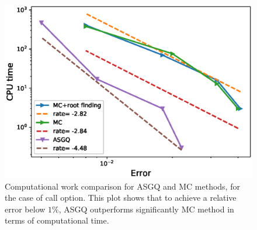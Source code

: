 \FloatBarrier
	\begin{figure}[h!]
\centering
\includegraphics[width=0.4\linewidth]{./figures/Call_Complexity_rates/error_vs_time}

\caption{Computational work comparison for ASGQ and MC methods, for the case of  call option. This plot shows that to achieve a relative error below $1\%$, ASGQ outperforms significantly MC method in terms of computational time.}
\label{fig:Complexity plot for MC and MISC , Call non rich}
\end{figure}


\FloatBarrier

